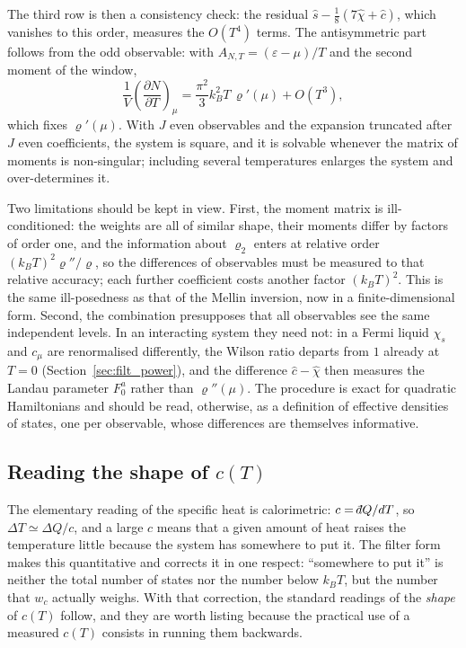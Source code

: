 \documentclass[10pt,a4paper]{article}
\theoremstyle{plain}
\theoremstyle{remark}
\newcommand{\dbar}{\mathchar'26\mkern-11mu d}
\begin{document}
The third row is then a consistency check: the residual
$ \hat s - \tfrac18(7\hat\chi + \hat c) $, which vanishes to this order, measures the
$ O(T^{4}) $ terms.
The antisymmetric part follows from the odd observable: with
$ A_{N,T} = (\varepsilon - \mu)/T $ and the second moment of the window,
\[
  \frac{1}{V}\left(\frac{\partial N}{\partial T}\right)_{\mu}
  = \frac{\pi^{2}}{3}k_B^{2}T\,\varrho'(\mu) + O(T^{3}) ,
\]
which fixes $ \varrho'(\mu) $. With $ J $ even observables and the expansion truncated
after $ J $ even coefficients, the system is square, and it is solvable whenever the matrix
of moments is non-singular; including several temperatures enlarges the system and
over-determines it.

Two limitations should be kept in view. First, the moment matrix is ill-conditioned:
the weights are all of similar shape, their moments differ by factors of order one,
and the information about $ \varrho_2 $ enters at relative order
$ (k_BT)^{2}\varrho''/\varrho $, so the differences of observables must be measured to that
relative accuracy; each further coefficient costs another factor $ (k_BT)^{2} $. This
is the same ill-posedness as that of the Mellin inversion, now in a finite-dimensional
form. Second, the combination presupposes that all observables see the same
independent levels. In an interacting system they need not: in a Fermi liquid
$ \chi_s $ and $ c_\mu $ are renormalised differently, the Wilson ratio departs from $ 1 $
already at $ T = 0 $ (Section~\ref{sec:filt_power}), and the difference $ \hat c - \hat\chi $
then measures the Landau parameter $ F_0^{a} $ rather than $ \varrho''(\mu) $. The
procedure is exact for quadratic Hamiltonians and should be read, otherwise, as a
definition of effective densities of states, one per observable, whose differences
are themselves informative.

\subsection{Reading the shape of \texorpdfstring{$c(T)$}{c(T)}}
\label{sec:filt_shape}

The elementary reading of the specific heat is calorimetric: $c=\dbar Q/dT$, so
$\Delta T\simeq\Delta Q/c$, and a large $c$ means that a given amount of heat
raises the temperature little because the system has somewhere to put it. The
filter form makes this quantitative and corrects it in one respect: ``somewhere
to put it'' is neither the total number of states nor the number below $k_BT$,
but the number that $w_c$ actually weighs. With that correction, the standard
readings of the \emph{shape} of $c(T)$ follow, and they are worth listing because
the practical use of a measured $c(T)$ consists in running them backwards.
\end{document}
